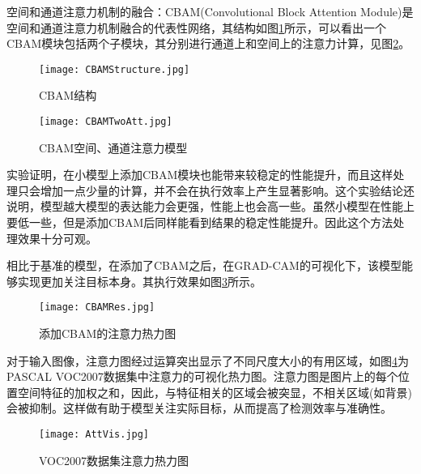 空间和通道注意力机制的融合：CBAM(Convolutional Block Attention Module)\cite{CBAM}是空间和通道注意力机制融合的代表性网络，其结构如图\ref{CBAMStructure}所示，可以看出一个CBAM模块包括两个子模块，其分别进行通道上和空间上的注意力计算，见图\ref{CBAMTwoAtt}。\\

\begin{figure}
	\center
	{\texttt{[image: CBAMStructure.jpg]}}
	\caption{CBAM结构}
	\label{CBAMStructure}
\end{figure}

\begin{figure}
	\center
	{\texttt{[image: CBAMTwoAtt.jpg]}}
	\caption{CBAM空间、通道注意力模型}
	\label{CBAMTwoAtt}
\end{figure}

实验证明，在小模型上添加CBAM模块也能带来较稳定的性能提升，而且这样处理只会增加一点少量的计算，并不会在执行效率上产生显著影响。这个实验结论还说明，模型越大模型的表达能力会更强，性能上也会高一些。虽然小模型在性能上要低一些，但是添加CBAM后同样能看到结果的稳定性能提升。因此这个方法处理效果十分可观。

相比于基准的模型，在添加了CBAM之后，在GRAD-CAM\cite{GCAM}的可视化下，该模型能够实现更加关注目标本身。其执行效果如图\ref{CBAMRes}所示。

\begin{figure}
	\center
	{\texttt{[image: CBAMRes.jpg]}}
	\caption{添加CBAM的注意力热力图}
	\label{CBAMRes}
\end{figure}


对于输入图像，注意力图经过运算突出显示了不同尺度大小的有用区域，如图\ref{AttVis}为PASCAL VOC2007数据集中注意力的可视化热力图。注意力图是图片上的每个位置空间特征的加权之和，因此，与特征相关的区域会被突显，不相关区域(如背景)会被抑制。这样做有助于模型关注实际目标，从而提高了检测效率与准确性。

\begin{figure}
	\center
	{\texttt{[image: AttVis.jpg]}}
	\caption{VOC2007数据集注意力热力图}
	\label{AttVis}
\end{figure}

